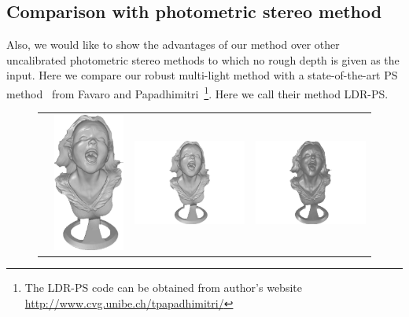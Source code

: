 \subsection{Comparison with photometric stereo method}
Also, we would like to show the advantages of our method over other uncalibrated photometric stereo methods to which no rough depth is given as the input.
Here we compare our robust multi-light method with a state-of-the-art PS method~\cite{favaro2012closed} from Favaro and Papadhimitri~\footnote{The LDR-PS code can be obtained from author's website \url{http://www.cvg.unibe.ch/tpapadhimitri/}}. 
Here we call their method LDR-PS.

\begin{figure}[H]
\centering
\setlength{\tabcolsep}{0.1em} %
 {\renewcommand{\arraystretch}{1.6}%
\begin{tabular}{c c c c}
   \multirow{-6}{*}{\parbox[t]{2.5mm}{}} &    
   \includegraphics[height = 0.24\linewidth]{figures/result/comp_gt_shape.pdf} 
   &
   \includegraphics[height = 0.24\linewidth]{figures/result/ps2_robust_front.pdf} &
   \includegraphics[height = 0.24\linewidth]{figures/result/ps2_LDR_front.pdf} \\


\end{tabular}}
\end{figure}
